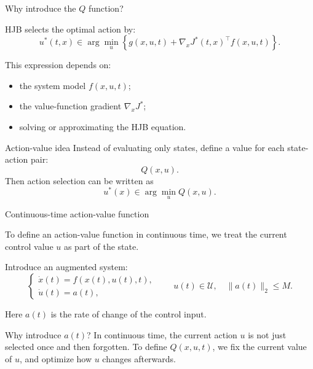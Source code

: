 \documentclass[aspectratio=169]{beamer}
\begin{document}
\begin{frame}{Why introduce the $Q$ function?}

HJB selects the optimal action by:
\[
u^*(t,x)
\in
\arg\min_u
\left\{
g(x,u,t)
+
\nabla_xJ^*(t,x)^\top f(x,u,t)
\right\}.
\]


This expression depends on:
\begin{itemize}
    \item the system model $f(x,u,t)$;
    \vspace{0.2cm}
    \item the value-function gradient $\nabla_xJ^*$;
    \vspace{0.2cm}
    \item solving or approximating the HJB equation.
\end{itemize}


\begin{block}{Action-value idea}
\small
Instead of evaluating only states, define a value for each state-action pair:
\[
Q(x,u).
\]
Then action selection can be written as
\[
u^*(x)\in\arg\min_u Q(x,u).
\]
\end{block}

\end{frame}

\begin{frame}{Continuous-time action-value function}

To define an action-value function in continuous time, we treat the current control value \(u\) as part of the state.

\vspace{0.15cm}

Introduce an augmented system:
\[
\begin{cases}
\dot{x}(t)=f(x(t),u(t),t),\\
\dot{u}(t)=a(t),
\end{cases}
\qquad
u(t)\in\mathcal U,\quad \|a(t)\|_2\le M .
\]

\vspace{0.15cm}

Here \(a(t)\) is the rate of change of the control input.

\vspace{0.2cm}

\begin{block}{Why introduce \(a(t)\)?}
\small
In continuous time, the current action \(u\) is not just selected once and then forgotten.
To define \(Q(x,u,t)\), we fix the current value of \(u\), and optimize how \(u\) changes afterwards.
\end{block}

\end{frame}
\end{document}
